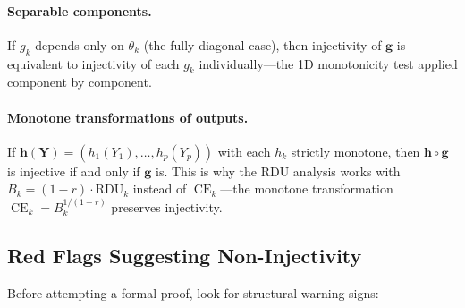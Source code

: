 \documentclass[11pt,a4paper]{article}
\theoremstyle{definition}
\DeclareMathOperator{\CE}{CE}
\begin{document}
\paragraph{Separable components.} If $g_k$ depends only on $\theta_k$ (the
fully diagonal case), then injectivity of $\mathbf{g}$ is equivalent to
injectivity of each $g_k$ individually---the 1D monotonicity test applied
component by component.

\paragraph{Monotone transformations of outputs.} If
$\mathbf{h}(\mathbf{Y}) = (h_1(Y_1), \ldots, h_p(Y_p))$ with each $h_k$
strictly monotone, then $\mathbf{h} \circ \mathbf{g}$ is injective if and only
if $\mathbf{g}$ is. This is why the RDU analysis works with
$B_k = (1-r) \cdot \text{RDU}_k$ instead of $\CE_k$---the monotone
transformation $\CE_k = B_k^{1/(1-r)}$ preserves injectivity.


\subsection{Red Flags Suggesting Non-Injectivity}

Before attempting a formal proof, look for structural warning signs:
\end{document}
